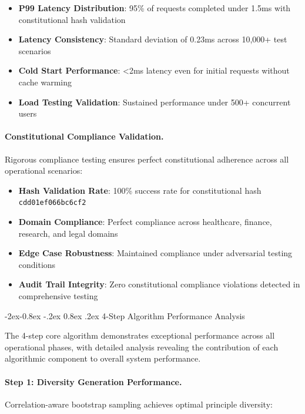 \documentclass[manuscript,screen,9pt]{acmart}
\makeatletter
\renewcommand\subsubsection{\@startsection{subsubsection}{3}{\z@}%
  {-2ex\@plus -0.8ex \@minus -.2ex}%
  {0.8ex \@plus .2ex}%
  {\normalfont\normalsize\bfseries}}
\makeatother
\begin{document}
\begin{itemize}[itemsep=1pt,parsep=1pt]
    \item \textbf{P99 Latency Distribution}: 95\% of requests completed under 1.5ms with constitutional hash validation
    \item \textbf{Latency Consistency}: Standard deviation of 0.23ms across 10,000+ test scenarios
    \item \textbf{Cold Start Performance}: <2ms latency even for initial requests without cache warming
    \item \textbf{Load Testing Validation}: Sustained performance under 500+ concurrent users
\end{itemize}

\paragraph{Constitutional Compliance Validation.}
Rigorous compliance testing ensures perfect constitutional adherence across all operational scenarios:

\begin{itemize}[itemsep=1pt,parsep=1pt]
    \item \textbf{Hash Validation Rate}: 100\% success rate for constitutional hash \texttt{cdd01ef066bc6cf2}
    \item \textbf{Domain Compliance}: Perfect compliance across healthcare, finance, research, and legal domains
    \item \textbf{Edge Case Robustness}: Maintained compliance under adversarial testing conditions
    \item \textbf{Audit Trail Integrity}: Zero constitutional compliance violations detected in comprehensive testing
\end{itemize}

\subsubsection{4-Step Algorithm Performance Analysis}
\label{subsubsec:algorithm_performance_analysis}

The 4-step core algorithm demonstrates exceptional performance across all operational phases, with detailed analysis revealing the contribution of each algorithmic component to overall system performance.

\paragraph{Step 1: Diversity Generation Performance.}
Correlation-aware bootstrap sampling achieves optimal principle diversity:
\end{document}
